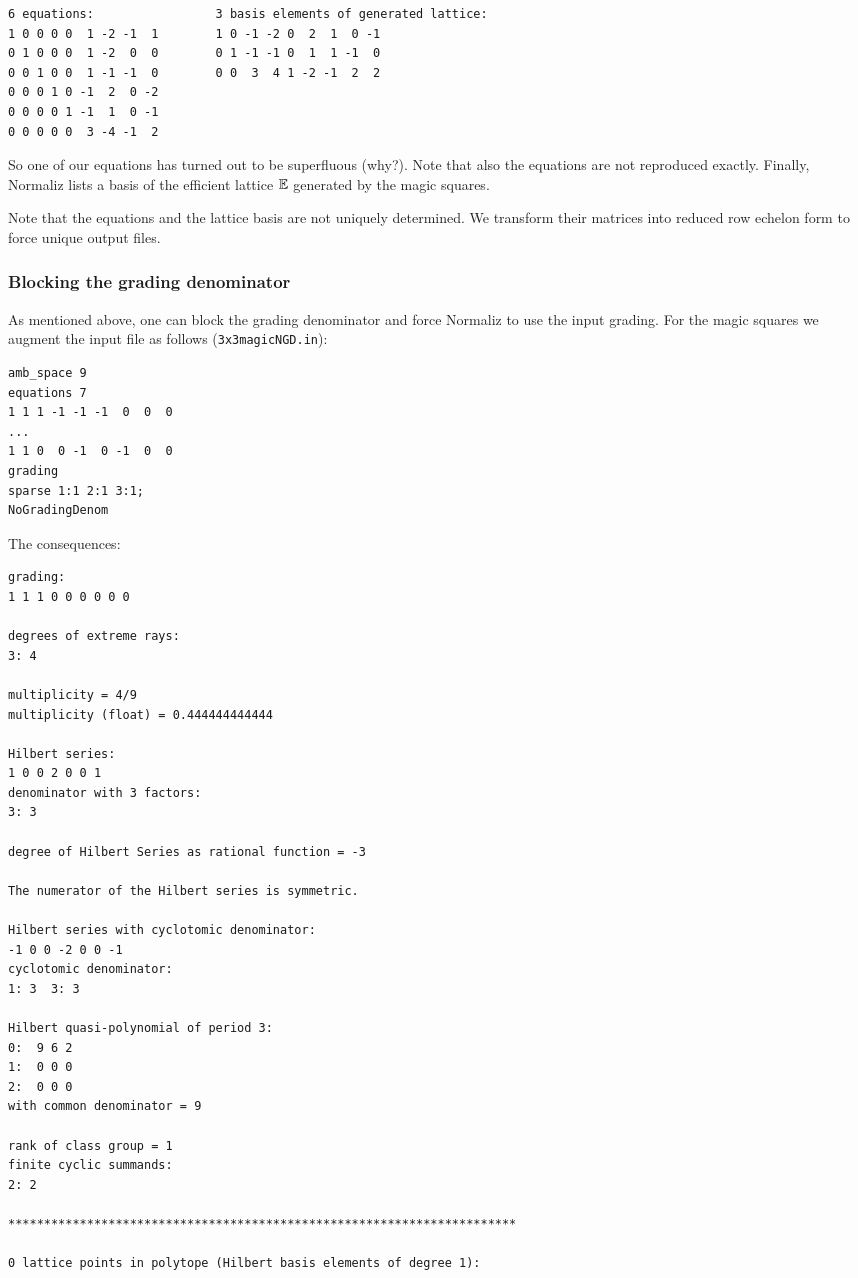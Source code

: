 \begin{Verbatim}
6 equations:                 3 basis elements of generated lattice:
1 0 0 0 0  1 -2 -1  1        1 0 -1 -2 0  2  1  0 -1
0 1 0 0 0  1 -2  0  0        0 1 -1 -1 0  1  1 -1  0
0 0 1 0 0  1 -1 -1  0        0 0  3  4 1 -2 -1  2  2
0 0 0 1 0 -1  2  0 -2
0 0 0 0 1 -1  1  0 -1
0 0 0 0 0  3 -4 -1  2
\end{Verbatim}
So one of our equations has turned out to be superfluous (why?). Note that also the equations are not reproduced exactly. Finally, Normaliz lists a basis of the efficient lattice ${\mathbb E}$ generated by the magic squares.

Note that the equations and the lattice basis are not uniquely determined. We transform their matrices into reduced row echelon form to force unique output files.

\subsubsection{Blocking the grading denominator}\label{NoGradingDenominator}

As mentioned above, one can block the grading denominator and force Normaliz to use the input grading. For the magic squares we augment the input file as follows (\verb|3x3magicNGD.in|):
\begin{Verbatim}
amb_space 9
equations 7
1 1 1 -1 -1 -1  0  0  0
...
1 1 0  0 -1  0 -1  0  0
grading
sparse 1:1 2:1 3:1;
NoGradingDenom
\end{Verbatim}
The consequences:
\begin{Verbatim}
grading:
1 1 1 0 0 0 0 0 0 

degrees of extreme rays:
3: 4  

multiplicity = 4/9
multiplicity (float) = 0.444444444444

Hilbert series:
1 0 0 2 0 0 1 
denominator with 3 factors:
3: 3  

degree of Hilbert Series as rational function = -3

The numerator of the Hilbert series is symmetric.

Hilbert series with cyclotomic denominator:
-1 0 0 -2 0 0 -1 
cyclotomic denominator:
1: 3  3: 3  

Hilbert quasi-polynomial of period 3:
0:  9 6 2
1:  0 0 0
2:  0 0 0
with common denominator = 9

rank of class group = 1
finite cyclic summands:
2: 2  

***********************************************************************

0 lattice points in polytope (Hilbert basis elements of degree 1):
\end{Verbatim}

